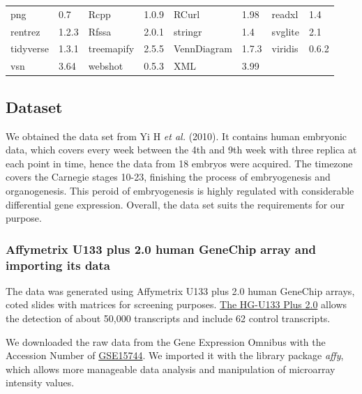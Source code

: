 \documentclass[
]{article}
\begin{document}
\begin{table}[htb]
{\begin{tabular}{@{}ll|ll|ll|ll@{}}
png                    & 0.7              & Rcpp             & 1.0.9            & RCurl            & 1.98             & readxl               & 1.4              \\
rentrez                & 1.2.3            & Rfssa            & 2.0.1            & stringr          & 1.4              & svglite              & 2.1              \\
tidyverse              & 1.3.1            & treemapify       & 2.5.5            & VennDiagram      & 1.7.3            & viridis              & 0.6.2            \\
vsn                    & 3.64             & webshot          & 0.5.3            & XML              & 3.99             &                      &                  \\ \bottomrule
\end{tabular}}
\end{table}

\hypertarget{dataset}{%
\subsection{Dataset}\label{dataset}}

We obtained the data set from Yi H \emph{et al.} (2010). It contains human embryonic data, which covers every week between the 4th and 9th week with three replica at each point in time, hence the data from 18 embryos were acquired. The timezone covers the Carnegie stages 10-23, finishing the process of embryogenesis and organogenesis. This peroid of embryogenesis is highly regulated with considerable differential gene expression. Overall, the data set suits the requirements for our purpose.

\hypertarget{affymetrix-u133-plus-2.0-human-genechip-array-and-importing-its-data}{%
\subsubsection{Affymetrix U133 plus 2.0 human GeneChip array and importing its data}\label{affymetrix-u133-plus-2.0-human-genechip-array-and-importing-its-data}}

The data was generated using Affymetrix U133 plus 2.0 human GeneChip arrays, coted slides with matrices for screening purposes. \href{https://www.affymetrix.com/support/technical/datasheets/human_datasheet.pdf}{The HG-U133 Plus 2.0} allows the detection of about 50,000 transcripts and include 62 control transcripts.

We downloaded the raw data from the Gene Expression Omnibus with the Accession Number of \href{https://www.ncbi.nlm.nih.gov/geo/query/acc.cgi?acc=GSE15744}{GSE15744}. We imported it with the library package \emph{affy}, which allows more manageable data analysis and manipulation of microarray intensity values.
\end{document}
